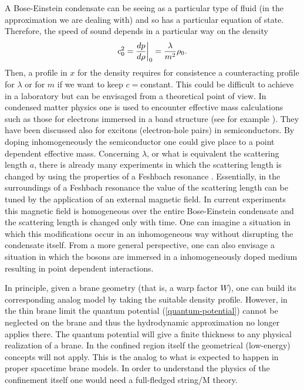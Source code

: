 \documentclass[a4paper,prl,showpacs,twocolumn]{revtex4}
\begin{document}
A Bose-Einstein condensate can be seeing as a particular type of fluid (in the
approximation we are dealing with) and so has a particular equation of
state.  Therefore, the speed of sound depends in a particular way on
the density
%
\begin{equation}
c_0^2={dp \over d \rho}\bigg|_0 = {\lambda \over m^2} \rho_0.
\end{equation}
%
Then, a profile in $x$ for the density requires for consistence a
counteracting profile for $\lambda$ or for $m$ if we want to keep
$c=$constant. This could be difficult to achieve in a laboratory but
can be envisaged from a theoretical point of view.  In condensed
matter physics one is used to encounter effective mass calculations
such as those for electrons immersed in a band structure (see for
example \cite{ziman}). They have been discussed also for excitons
(electron-hole pairs) in semiconductors.  By doping inhomogeneously
the semiconductor one could give place to a point dependent effective
mass. Concerning $\lambda$, or what is equivalent the scattering
length $a$, there is already many experiments in which the scattering
length is changed by using the properties of a Feshbach resonance
\cite{feshbach}. Essentially, in the surroundings of a Feshbach
resonance the value of the scattering length can be tuned by the
application of an external magnetic field. In current experiments this
magnetic field is homogeneous over the entire Bose-Einstein condensate
and the scattering length is changed only with time. One can imagine a
situation in which this modifications occur in an inhomogeneous way
without disrupting the condensate itself. From a more general
perspective, one can also envisage a situation in which the bosons
are immersed in a inhomogeneously doped medium resulting in
point dependent interactions. 




In principle, given a brane geometry (that is, a warp factor $W$), 
one can build 
its corresponding analog model by taking the suitable density profile.
However, in the thin brane limit the quantum potential
(\ref{quantum-potential}) cannot be neglected on the brane and thus
the hydrodynamic approximation no longer applies there.
The quantum potential will give a finite thickness to any physical
realization of a brane. 
In the confined region itself the geometrical (low-energy) concepts 
will not apply. 
This is the analog to what is expected to happen in proper spacetime
brane models. 
In order to understand the physics of the confinement itself one would 
need a full-fledged string/M theory.
\end{document}
